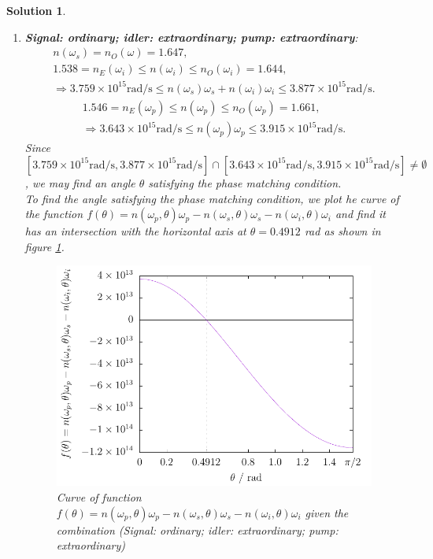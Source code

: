 \documentclass[UTF8,10pt,a4paper]{article}
\theoremstyle{Problem}
\theoremstyle{Solution}
\newtheorem*{sol}{Solution}
\begin{document}
\begin{sol}
\begin{enumerate}
\begin{enumerate}
\begin{gather}
            \end{gather}
            \begin{gather}
                n(\omega_p)=n_O(\omega)=1.661,\\
                \Longrightarrow n(\omega_p)\omega_p=3.915\times 10^{15}\text{rad}/\text{s}.
            \end{gather}
            Since $3.915\times 10^{15}\text{rad}/\text{s}\notin[3.759\times 10^{15}\text{rad}/\text{s},3.877\times 10^{15}\text{rad}/\text{s}]$, we can not tune angle $\theta$ to achieve the phase matching condition.
            \item \textbf{Signal: ordinary; idler: extraordinary; pump: extraordinary}:
            \begin{gather}
                n(\omega_s)=n_O(\omega)=1.647,\\
                1.538=n_E(\omega_i)\leq n(\omega_i)\leq n_O(\omega_i)=1.644,\\
                \Longrightarrow 3.759\times 10^{15}\text{rad}/\text{s}\leq n(\omega_s)\omega_s+n(\omega_i)\omega_i\leq 3.877\times 10^{15}\text{rad}/\text{s}.
            \end{gather}
            \begin{gather}
                1.546=n_E(\omega_p)\leq n(\omega_p)\leq n_O(\omega_p)=1.661,\\
                \Longrightarrow 3.643\times 10^{15}\text{rad}/\text{s}\leq n(\omega_p)\omega_p\leq 3.915\times 10^{15}\text{rad}/\text{s}.
            \end{gather}
            Since $[3.759\times 10^{15}\text{rad}/\text{s},3.877\times 10^{15}\text{rad}/\text{s}]\cap[3.643\times 10^{15}\text{rad}/\text{s},3.915\times 10^{15}\text{rad}/\text{s}]\neq\emptyset$, we may find an angle $\theta$ satisfying the phase matching condition.\\
            To find the angle satisfying the phase matching condition, we plot he curve of the function $f(\theta)=n(\omega_p,\theta)\omega_p-n(\omega_s,\theta)\omega_s-n(\omega_i,\theta)\omega_i$ and find it has an intersection with the horizontal axis at $\theta=0.4912$ rad as shown in figure \ref{phase-matching-eoe}.
            \begin{figure}[h]
                \centering
                \includegraphics[width=.5\textwidth]{phase-matching-II-eoe.pdf}
                \caption{Curve of function $f(\theta)=n(\omega_p,\theta)\omega_p-n(\omega_s,\theta)\omega_s-n(\omega_i,\theta)\omega_i$ given the combination (Signal: ordinary; idler: extraordinary; pump: extraordinary)}
                \label{phase-matching-eoe}
            \end{figure}


\end{enumerate}
\end{enumerate}
\end{sol}
\end{document}
